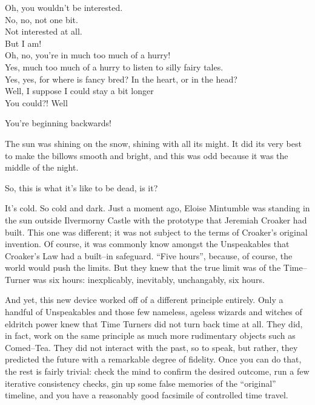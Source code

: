 {Oh, you wouldn’t be interested.\\
No, no, not one bit.\\
Not interested at all.\\
But I am!\\
Oh, no, you’re in much too much of a hurry!\\
Yes, much too much of a hurry to listen to silly fairy tales.\\
Yes, yes, for where is fancy bred? In the heart, or in the head?\\
Well, I suppose I could stay a bit longer{\el}\\
You could?! Well{\el}

}%
{You’re beginning backwards!} %


\simpleline
{}
The sun was shining on the snow, shining with all its might. It did its very best to make the billows smooth and bright, and this was odd because it was the middle of the night.

So, this is what it’s like to be dead, is it?

It’s cold. So cold and dark. Just a moment ago, Eloise Mintumble was standing in the sun outside Ilvermorny Castle with the prototype that Jeremiah Croaker had built. This one was different; it was not subject to the terms of Croaker’s original invention. Of course, it was commonly know amongst the Unspeakables that Croaker’s Law had a built\mbox{--}in safeguard. “Five hours”, because, of course, the world would push the limits. But they knew that the true limit was of the Time\mbox{--}Turner was six hours: inexplicably, inevitably, unchangably, six hours.

And yet, this new device worked off of a different principle entirely. Only a handful of Unspeakables and those few nameless, ageless wizards and witches of eldritch power knew that Time Turners did not turn back time at all. They did, in fact, work on the same principle as much more rudimentary objects such as Comed\mbox{--}Tea. They did not interact with the past, so to speak, but rather, they predicted the future with a remarkable degree of fidelity. Once you can do that, the rest is fairly trivial: check the mind to confirm the desired outcome, run a few iterative consistency checks, gin up some false memories of the “original” timeline, and you have a reasonably good facsimile of controlled time travel.


